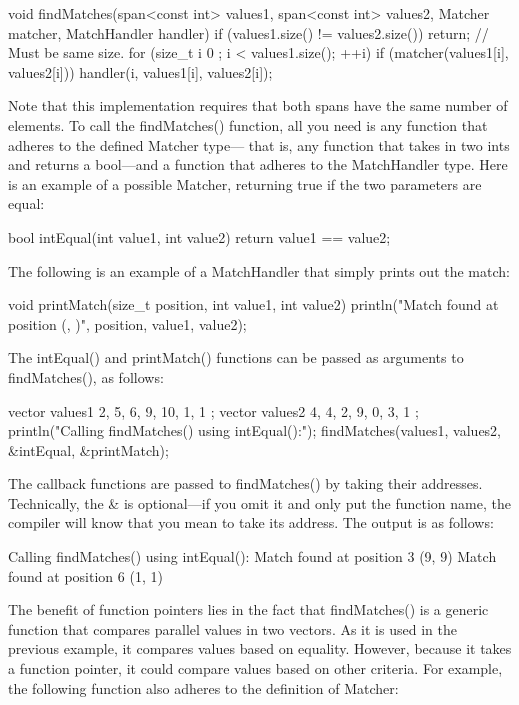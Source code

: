 \begin{cpp}
void findMatches(span<const int> values1, span<const int> values2,
Matcher matcher, MatchHandler handler)
{
    if (values1.size() != values2.size()) { return; } // Must be same size.
    for (size_t i { 0 }; i < values1.size(); ++i) {
        if (matcher(values1[i], values2[i])) {
            handler(i, values1[i], values2[i]);
        }
    }
}
\end{cpp}

Note that this implementation requires that both spans have the same number of elements. To call the findMatches() function, all you need is any function that adheres to the defined Matcher type— that is, any function that takes in two ints and returns a bool—and a function that adheres to the MatchHandler type. Here is an example of a possible Matcher, returning true if the two parameters are equal:

\begin{cpp}
bool intEqual(int value1, int value2) { return value1 == value2; }
\end{cpp}

The following is an example of a MatchHandler that simply prints out the match:

\begin{cpp}
void printMatch(size_t position, int value1, int value2)
{
    println("Match found at position {} ({}, {})", position, value1, value2);
}
\end{cpp}

The intEqual() and printMatch() functions can be passed as arguments to findMatches(), as follows:

\begin{cpp}
vector values1 { 2, 5, 6, 9, 10, 1, 1 };
vector values2 { 4, 4, 2, 9, 0, 3, 1 };
println("Calling findMatches() using intEqual():");
findMatches(values1, values2, &intEqual, &printMatch);
\end{cpp}

The callback functions are passed to findMatches() by taking their addresses. Technically, the \& is optional—if you omit it and only put the function name, the compiler will know that you mean to take its address. The output is as follows:

\begin{shell}
Calling findMatches() using intEqual():
Match found at position 3 (9, 9)
Match found at position 6 (1, 1)
\end{shell}

The benefit of function pointers lies in the fact that findMatches() is a generic function that compares parallel values in two vectors. As it is used in the previous example, it compares values based on equality. However, because it takes a function pointer, it could compare values based on other criteria. For example, the following function also adheres to the definition of Matcher:

